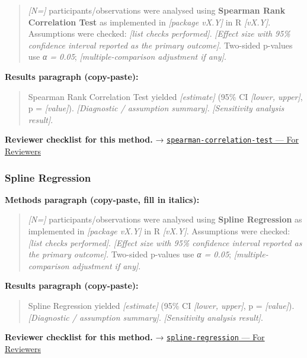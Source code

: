 \documentclass[
]{article}
\begin{document}
\begin{quote}
\emph{{[}N={]}} participants/observations were analysed using
\textbf{Spearman Rank Correlation Test} as implemented in
\emph{{[}package vX.Y{]}} in R \emph{{[}vX.Y{]}}. Assumptions were
checked: \emph{{[}list checks performed{]}}. \emph{{[}Effect size with
95\% confidence interval reported as the primary outcome{]}}. Two-sided
p-values use \emph{α = 0.05}; \emph{{[}multiple-comparison adjustment if
any{]}}.
\end{quote}

\textbf{Results paragraph (copy-paste):}

\begin{quote}
Spearman Rank Correlation Test yielded \emph{{[}estimate{]}} (95\% CI
\emph{{[}lower, upper{]}}, p = \emph{{[}value{]}}). \emph{{[}Diagnostic
/ assumption summary{]}}. \emph{{[}Sensitivity analysis result{]}}.
\end{quote}

\textbf{Reviewer checklist for this method.} →
\href{../chapters/04-inferential/spearman-correlation-test.Rmd\#for-reviewers}{\texttt{spearman-correlation-test}
--- For Reviewers}

\subsubsection{Spline Regression}\label{spline-regression}

\textbf{Methods paragraph (copy-paste, fill in italics):}

\begin{quote}
\emph{{[}N={]}} participants/observations were analysed using
\textbf{Spline Regression} as implemented in \emph{{[}package vX.Y{]}}
in R \emph{{[}vX.Y{]}}. Assumptions were checked: \emph{{[}list checks
performed{]}}. \emph{{[}Effect size with 95\% confidence interval
reported as the primary outcome{]}}. Two-sided p-values use \emph{α =
0.05}; \emph{{[}multiple-comparison adjustment if any{]}}.
\end{quote}

\textbf{Results paragraph (copy-paste):}

\begin{quote}
Spline Regression yielded \emph{{[}estimate{]}} (95\% CI \emph{{[}lower,
upper{]}}, p = \emph{{[}value{]}}). \emph{{[}Diagnostic / assumption
summary{]}}. \emph{{[}Sensitivity analysis result{]}}.
\end{quote}

\textbf{Reviewer checklist for this method.} →
\href{../chapters/07-regression/spline-regression.Rmd\#for-reviewers}{\texttt{spline-regression}
--- For Reviewers}
\end{document}
